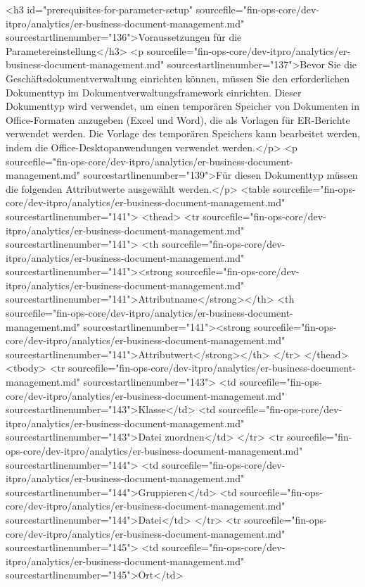 <h3 id="prerequisites-for-parameter-setup" sourcefile="fin-ops-core/dev-itpro/analytics/er-business-document-management.md" sourcestartlinenumber="136">Voraussetzungen für die Parametereinstellung</h3>
<p sourcefile="fin-ops-core/dev-itpro/analytics/er-business-document-management.md" sourcestartlinenumber="137">Bevor Sie die Geschäftsdokumentverwaltung einrichten können, müssen Sie den erforderlichen Dokumenttyp im Dokumentverwaltungsframework einrichten. Dieser Dokumenttyp wird verwendet, um einen temporären Speicher von Dokumenten in Office-Formaten anzugeben (Excel und Word), die als Vorlagen für ER-Berichte verwendet werden. Die Vorlage des temporären Speichers kann bearbeitet werden, indem die Office-Desktopanwendungen verwendet werden.</p>
<p sourcefile="fin-ops-core/dev-itpro/analytics/er-business-document-management.md" sourcestartlinenumber="139">Für diesen Dokumenttyp müssen die folgenden Attributwerte ausgewählt werden.</p>
<table sourcefile="fin-ops-core/dev-itpro/analytics/er-business-document-management.md" sourcestartlinenumber="141">
<thead>
<tr sourcefile="fin-ops-core/dev-itpro/analytics/er-business-document-management.md" sourcestartlinenumber="141">
<th sourcefile="fin-ops-core/dev-itpro/analytics/er-business-document-management.md" sourcestartlinenumber="141"><strong sourcefile="fin-ops-core/dev-itpro/analytics/er-business-document-management.md" sourcestartlinenumber="141">Attributname</strong></th>
<th sourcefile="fin-ops-core/dev-itpro/analytics/er-business-document-management.md" sourcestartlinenumber="141"><strong sourcefile="fin-ops-core/dev-itpro/analytics/er-business-document-management.md" sourcestartlinenumber="141">Attributwert</strong></th>
</tr>
</thead>
<tbody>
<tr sourcefile="fin-ops-core/dev-itpro/analytics/er-business-document-management.md" sourcestartlinenumber="143">
<td sourcefile="fin-ops-core/dev-itpro/analytics/er-business-document-management.md" sourcestartlinenumber="143">Klasse</td>
<td sourcefile="fin-ops-core/dev-itpro/analytics/er-business-document-management.md" sourcestartlinenumber="143">Datei zuordnen</td>
</tr>
<tr sourcefile="fin-ops-core/dev-itpro/analytics/er-business-document-management.md" sourcestartlinenumber="144">
<td sourcefile="fin-ops-core/dev-itpro/analytics/er-business-document-management.md" sourcestartlinenumber="144">Gruppieren</td>
<td sourcefile="fin-ops-core/dev-itpro/analytics/er-business-document-management.md" sourcestartlinenumber="144">Datei</td>
</tr>
<tr sourcefile="fin-ops-core/dev-itpro/analytics/er-business-document-management.md" sourcestartlinenumber="145">
<td sourcefile="fin-ops-core/dev-itpro/analytics/er-business-document-management.md" sourcestartlinenumber="145">Ort</td>

